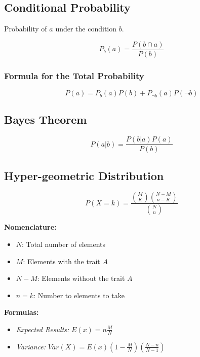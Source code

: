 \subsection{Conditional Probability}

Probability of \(a\) under the condition \(b\).

\[
    P_b (a) = \frac{P(b \cap a)}{P(b)}
\]

\subsubsection{Formula for the Total Probability}

\[
    P(a) = P_b (a) P(b) + P_{\neg b}(a) P(\neg b)
\]

\subsection{Bayes Theorem}

\[
    P(a | b) = \frac{P(b | a) P(a)}{P(b)}
\]

\subsection{Hyper-geometric Distribution}

\[
    P(X = k) = \frac{\binom{M}{K} \binom{N - M}{n - K}}{\binom{N}{n}}
\]

\textbf{Nomenclature:}

\begin{itemize}

    \item \(N\): Total number of elements

    \item \(M\): Elements with the trait \(A\)

    \item \(N - M\): Elements without the trait \(A\)

    \item \(n = k\): Number to elements to take

\end{itemize}

\textbf{Formulas:}

\begin{itemize}

    \item \emph{Expected Results: } \(E(x) = n \frac{M}{N}\)

    \item \emph{Variance: } \(Var(X) = E(x)\left(1 - \frac{M}{N}\right) \left(\frac{N - n}{N - 1}\right)\)

\end{itemize}

